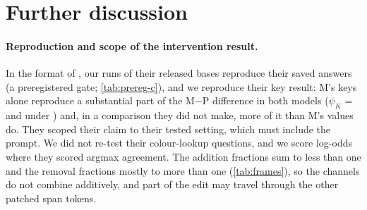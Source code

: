 \begin{table}[!ht]
\centering
\footnotesize
\caption{\textbf{The remap under each blocking at Mistral-Small-24B} (preregistration I; values as printed by the scorer). $t = D^O/D^\emptyset$; superscripts $O$ and $\emptyset$: with and without the blocking; $\kappa = K/(K+V)$ with the $\kappa$ rule (--: $\kappa$ undefined in 99\% of resamples; $\Delta_V$ not applicable or M$\to$T not printed); $\tilde\psi_K = K^O/D^\emptyset$ and $\tilde\psi_V = V^O/D^\emptyset$; $\Delta_V = V^O - V^\emptyset$, paired by core; $D$, $K$, $V$: M's effect, its key-only and its value-only part, in nats; M$\to$T: share of (core, fit) items whose top answer is M's target. A: mean-ablation of the heads' outputs at the option rows; A$^+$: with block 5; N: no attention from the option rows to the writing token. $^\dagger$Exploratory: N(all at $G$), every head at the option rows $G$; A(block 5), the 32 heads of block 5 alone; N(rand0), the first random set of 64; A($H^*_{\text{\fmtOpt{}}}$), the \fmtOpt{} set ablated under \fmtLetter{}. 95\% core-bootstrap CIs.}
\label{tab:link}
{\scriptsize\setlength{\tabcolsep}{3pt}}
\end{table}

\clearpage
\section{Further discussion}\label{app:discussion}

\paragraph{Reproduction and scope of the intervention result.} In the format of \citet{anonymous2026fitted}, our runs of their released bases reproduce their saved answers (a preregistered gate; \cref{tab:prereg-c}), and we reproduce their key result: M's keys alone reproduce a substantial part of the M$-$P difference in both models ($\psi_K$ = \psiOptMistral{} and \psiOptQwen{} under \fmtOpt{}) and, in a comparison they did not make, more of it than M's values do. They scoped their claim to their tested setting, which must include the prompt. We did not re-test their colour-lookup questions, and we score log-odds where they scored argmax agreement. The addition fractions sum to less than one and the removal fractions mostly to more than one (\cref{tab:frames}), so the channels do not combine additively, and part of the edit may travel through the other patched span tokens.

